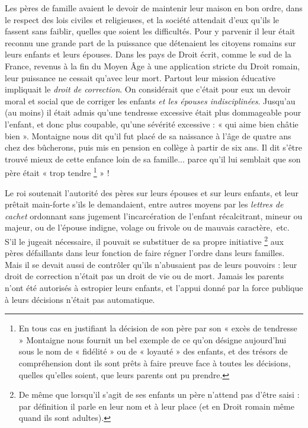     Les pères de famille avaient le devoir de maintenir leur maison en bon ordre, dans le respect des lois civiles et religieuses, et la société attendait d'eux qu'ils le fassent sans faiblir, quelles que soient les difficultés. Pour y parvenir il leur était reconnu une grande part de la puissance que détenaient les citoyens romains sur leurs enfants et leurs épouses. Dans les pays de Droit écrit, comme le sud de la France, revenus à la fin du Moyen Âge à une application stricte du Droit romain, leur puissance ne cessait qu'avec leur mort. Partout leur mission éducative impliquait le \emph{droit de correction}. On considérait que c'était pour eux un devoir moral et social que de corriger les enfants \emph{et les épouses indisciplinées}. Jusqu'au  (au moins) il était admis qu'une tendresse excessive était plus dommageable pour l'enfant, et donc plus coupable, qu'une sévérité excessive : « {qui aime bien châtie bien} ». Montaigne nous dit qu'il fut placé de sa naissance à l'âge de quatre ans chez des bûcherons, puis mis en pension en collège à partir de six ans. Il dit s'être trouvé mieux de cette enfance loin de sa famille... parce qu'il lui semblait que son père était « trop tendre%
\footnote{En tous cas en justifiant la décision de son père par son « excès de tendresse » Montaigne nous fournit un bel exemple de ce qu'on désigne aujourd'hui sous le nom de « fidélité » ou de « loyauté » des enfants, et des trésors de compréhension dont ils sont prêts à faire preuve face à toutes les décisions, quelles qu'elles soient, que leurs parents ont pu prendre.} 
» !

 Le roi soutenait l'autorité des pères sur leurs épouses et sur leurs enfants, et leur prêtait main-forte s'ils le demandaient, entre autres moyens par les \emph{lettres de cachet} ordonnant sans jugement l'incarcération de l'enfant récalcitrant, mineur ou majeur, ou de l'épouse indigne, volage ou frivole ou de mauvais caractère,~etc. S'il le jugeait nécessaire, il pouvait se substituer de sa propre initiative%
\footnote{De même que lorsqu'il s'agit de ses enfants un père n'attend pas d'être saisi : par définition il parle en leur nom et à leur place (et en Droit romain même quand ils sont adultes).} 
aux pères défaillants dans leur fonction de faire régner l'ordre dans leurs familles. 
 Mais il se devait aussi de contrôler qu'ils n'abusaient pas de leurs pouvoirs : leur droit de correction n'était pas un droit de vie ou de mort. Jamais les parents n'ont été autorisés à estropier leurs enfants, et l'appui donné par la force publique à leurs décisions n'était pas automatique.


